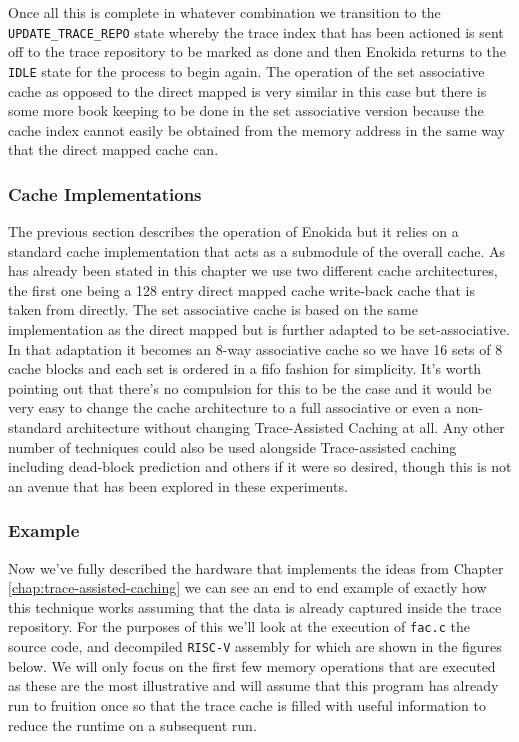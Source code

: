 Once all this is complete in whatever combination we transition to the \texttt{UPDATE\_TRACE\_REPO} state whereby the trace index that has been actioned is sent off to the trace repository to be marked as done and then Enokida returns to the \texttt{IDLE} state for the process to begin again. The operation of the set associative cache as opposed to the direct mapped is very similar in this case but there is some more book keeping to be done in the set associative version because the cache index cannot easily be obtained from the memory address in the same way that the direct mapped cache can.

\subsubsection{Cache Implementations}

The previous section describes the operation of Enokida but it relies on a standard cache implementation that acts as a submodule of the overall cache. As has already been stated in this chapter we use two different cache architectures, the first one being a 128 entry direct mapped cache write-back cache that is taken from \citet{hennessyComputerArchitectureQuantitative2019} directly. The set associative cache is based on the same implementation as the direct mapped but is further adapted to be set-associative. In that adaptation it becomes an 8-way associative cache so we have 16 sets of 8 cache blocks and each set is ordered in a \gls{fifo} fashion for simplicity. It's worth pointing out that there's no compulsion for this to be the case and it would be very easy to change the cache architecture to a full associative or even a non-standard architecture without changing Trace-Assisted Caching at all. Any other number of techniques could also be used alongside Trace-assisted caching including dead-block prediction and others if it were so desired, though this is not an avenue that has been explored in these experiments. 

\subsubsection{Example}

Now we've fully described the hardware that implements the ideas from Chapter \ref{chap:trace-assisted-caching} we can see an end to end example of exactly how this technique works assuming that the data is already captured inside the trace repository. For the purposes of this we'll look at the execution of \texttt{fac.c} the source code, and decompiled \texttt{RISC-V} assembly for which are shown in the figures below. We will only focus on the first few memory operations that are executed as these are the most illustrative and will assume that this program has already run to fruition once so that the trace cache is filled with useful information to reduce the runtime on a subsequent run.

